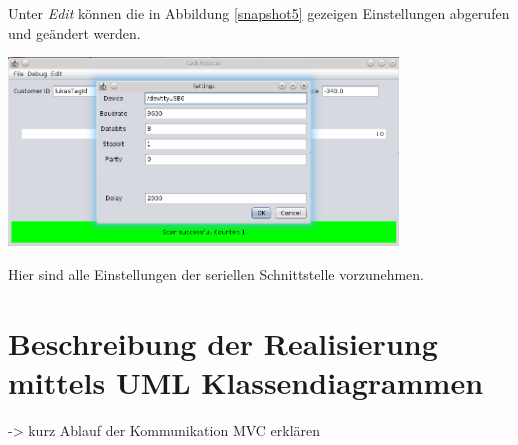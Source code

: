 \documentclass[11pt]{article} %
\begin{document}
\newline
Unter \textit{Edit} können die in Abbildung \ref{snapshot5} gezeigen
Einstellungen abgerufen und geändert werden.
\begin{center}
\includegraphics[height=5cm,keepaspectratio]{snapshot5.png}
\label{snapshot5}
\end{center}
Hier sind alle Einstellungen der seriellen Schnittstelle vorzunehmen.
~\newline
\section{Beschreibung der Realisierung mittels UML Klassendiagrammen}
-> kurz Ablauf der Kommunikation MVC erklären
\end{document}
